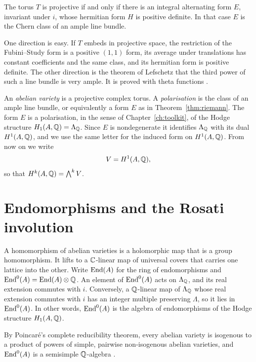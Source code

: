 \begin{theorem}\label{thm:riemann}
The torus $T$ is projective if and only if there is an integral
alternating form $E$, invariant under $i$, whose hermitian form $H$ is
positive definite. In that case $E$ is the Chern class of an ample line
bundle.
\end{theorem}

One direction is easy. If $T$ embeds in projective space, the restriction
of the Fubini--Study form is a positive $(1,1)$ form, its average under
translations has constant coefficients and the same class, and its
hermitian form is positive definite. The other direction is the theorem
of Lefschetz that the third power of such a line bundle is very ample. It
is proved with theta functions \cite{Mum70}.

An \emph{abelian variety} is a projective complex torus. A
\emph{polarisation} is the class of an ample line bundle, or equivalently
a form $E$ as in Theorem~\ref{thm:riemann}. The form $E$ is a
polarisation, in the sense of Chapter~\ref{ch:toolkit}, of the Hodge
structure $H_{1}(A,\mathbb{Q})=\Lambda_{\mathbb{Q}}$. Since $E$ is nondegenerate it
identifies $\Lambda_{\mathbb{Q}}$ with its dual $H^{1}(A,\mathbb{Q})$, and we use the
same letter for the induced form on $H^{1}(A,\mathbb{Q})$. From now on we write
\[
  V=H^{1}(A,\mathbb{Q}),
\]
so that $H^{k}(A,\mathbb{Q})=\bigwedge^{k}V$.

\section{Endomorphisms and the Rosati involution}

A homomorphism of abelian varieties is a holomorphic map that is a group
homomorphism. It lifts to a $\mathbb{C}$-linear map of universal covers that
carries one lattice into the other. Write $\operatorname{End}(A)$ for the ring of
endomorphisms and $\operatorname{End}^{0}(A)=\operatorname{End}(A)\otimes\mathbb{Q}$. An element of
$\operatorname{End}^{0}(A)$ acts on $\Lambda_{\mathbb{Q}}$, and its real extension commutes with
$i$. Conversely, a $\mathbb{Q}$-linear map of $\Lambda_{\mathbb{Q}}$ whose real extension
commutes with $i$ has an integer multiple preserving $\Lambda$, so it lies
in $\operatorname{End}^{0}(A)$. In other words, $\operatorname{End}^{0}(A)$ is the algebra of
endomorphisms of the Hodge structure $H_{1}(A,\mathbb{Q})$.

By Poincar\'e's complete reducibility theorem, every abelian variety is
isogenous to a product of powers of simple, pairwise non-isogenous abelian
varieties, and $\operatorname{End}^{0}(A)$ is a semisimple $\mathbb{Q}$-algebra
\cite{Mum70}.

